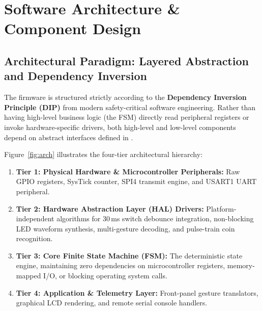 \section{Software Architecture \& Component Design}
\label{sec:arch}

\subsection{Architectural Paradigm: Layered Abstraction and Dependency Inversion}

The firmware is structured strictly according to the \textbf{Dependency Inversion Principle (DIP)}
from modern safety-critical software engineering. Rather than having high-level business logic
(the FSM) directly read peripheral registers or invoke hardware-specific drivers, both high-level
and low-level components depend on abstract interfaces defined in .

Figure~\ref{fig:arch} illustrates the four-tier architectural hierarchy:
\begin{enumerate}
  \item \textbf{Tier 1: Physical Hardware \& Microcontroller Peripherals:} Raw GPIO registers, SysTick
        counter, SPI4 transmit engine, and USART1 UART peripheral.
  \item \textbf{Tier 2: Hardware Abstraction Layer (HAL) Drivers:} Platform-independent algorithms
        for 30\,ms switch debounce integration, non-blocking LED waveform
        synthesis, multi-gesture decoding, and pulse-train coin recognition.
  \item \textbf{Tier 3: Core Finite State Machine (FSM):} The deterministic state engine,
        maintaining zero dependencies on microcontroller registers,
        memory-mapped I/O, or blocking operating system calls.
  \item \textbf{Tier 4: Application \& Telemetry Layer:} Front-panel gesture translators,
        graphical LCD rendering, and remote serial console handlers.
\end{enumerate}

